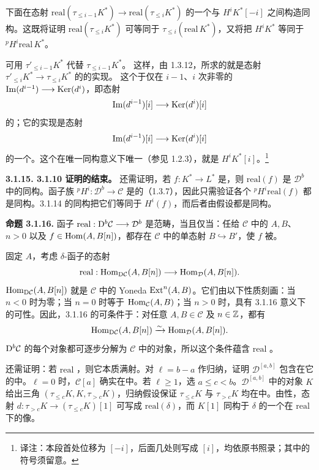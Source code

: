 下面在态射
$\mathrm{real}(\tau_{\leq i-1}K^*)\longrightarrow\mathrm{real}(\tau_{\leq i}K^*)$
的一个与 $H^iK^*[-i]$ 之间构造同构。这既将证明
$\mathrm{real}(\tau_{\leq i}K^*)$ 可等同于
$\tau_{\leq i}(\mathrm{real}\,K^*)$，又将把 $H^iK^*$ 等同于
${}^pH^i\mathrm{real}\,K^*$。

可用 $\tau'_{\leq i-1}K^*$ 代替 $\tau_{\leq i-1}K^*$。
这样，由 1.3.12，所求的就是态射
$\tau'_{\leq i}K^*\longrightarrow\tau_{\leq i}K^*$ 的的实现。
这个于仅在 $i-1$、$i$ 次非零的
$\operatorname{Im}(d^{i-1})\longrightarrow\operatorname{Ker}(d^i)$，即态射
\[
\operatorname{Im}(d^{i-1})[i]\longrightarrow\operatorname{Ker}(d^i)[i]
\]
的；它的实现是态射
\[
\operatorname{Im}(d^{i-1})[i]\longrightarrow\operatorname{Ker}(d^i)[i]
\]
的一个。这个在唯一同构意义下唯一（参见 1.2.3），就是 $H^iK^*[i]$。\footnote{译注：本段首处位移为 $[-i]$，后面几处则写成 $[i]$，均依原书照录；其中的符号须留意。}

\par\medskip\noindent\textbf{3.1.15. 3.1.10 证明的结束。}
还需证明，若 $f:K^*\longrightarrow L^*$ 是，则
$\mathrm{real}(f)$ 是 $\mathcal D^b$ 中的同构。函子族
${}^pH^i:\mathcal D^b\longrightarrow\mathcal C$
是的（1.3.7），因此只需验证各个
${}^pH^i\mathrm{real}(f)$ 都是同构。3.1.14 的同构把它们等同于 $H^i(f)$，而后者由假设都是同构。

\par\medskip\noindent\textbf{命题 3.1.16.}
函子 $\mathrm{real}:\mathrm{D}^b\mathcal C\longrightarrow\mathcal D^b$ 是范畴，当且仅当：任给 $\mathcal C$ 中的 $A,B$、$n>0$ 以及 $f\in\operatorname{Hom}(A,B[n])$，都存在 $\mathcal C$ 中的单态射 $B\hookrightarrow B'$，使 $f$ 被。

固定 $A$，考虑 $\delta$-函子的态射
\[
\mathrm{real}:\operatorname{Hom}_{\mathrm{D}\mathcal C}(A,B[n])\longrightarrow
\operatorname{Hom}_{\mathcal D}(A,B[n]).
\]
$\operatorname{Hom}_{\mathrm{D}\mathcal C}(A,B[n])$ 就是 $\mathcal C$ 中的 Yoneda $\operatorname{Ext}^n(A,B)$。它们由以下性质刻画：当 $n<0$ 时为零；当 $n=0$ 时等于 $\operatorname{Hom}_{\mathcal C}(A,B)$；当 $n>0$ 时，具有 3.1.16 意义下的可性。因此，3.1.16 的可条件于：对任意 $A,B\in\mathcal C$ 及
$n\in\mathbb Z$，都有
\[
\operatorname{Hom}_{\mathrm{D}\mathcal C}(A,B[n])\xrightarrow{\sim}
\operatorname{Hom}_{\mathcal D}(A,B[n]).
\]
$\mathrm{D}^b\mathcal C$ 的每个对象都可逐步分解为 $\mathcal C$ 中的对象，所以这个条件蕴含 $\mathrm{real}$ 。

还需证明：若 $\mathrm{real}$ ，则它本质满射。对 $\ell=b-a$ 作归纳，证明 $\mathcal D^{[a,b]}$ 包含在它的中。$\ell=0$ 时，$\mathcal C[a]$ 确实在中。若 $\ell\geq1$，选 $a\leq c<b$。$\mathcal D^{[a,b]}$ 中的对象 $K$ 给出三角
$(\tau_{\leq c}K,K,\tau_{>c}K)$，归纳假设保证
$\tau_{\leq c}K$ 与 $\tau_{>c}K$ 均在中。由性，态射
$d:\tau_{>c}K\longrightarrow(\tau_{\leq c}K)[1]$
可写成 $\mathrm{real}(\delta)$，而 $K[1]$ 同构于 $\delta$ 的一个在 $\mathrm{real}$ 下的像。

